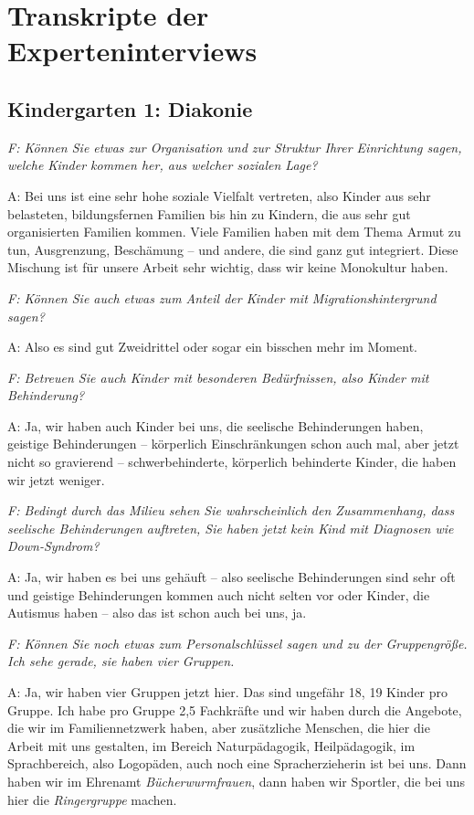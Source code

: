 \chapter{Transkripte der Experteninterviews}
\section{Kindergarten 1: Diakonie}
\begin{linenumbers*}
\emph{F: Können Sie etwas zur Organisation und zur Struktur Ihrer Einrichtung sagen, welche Kinder kommen her, aus welcher sozialen Lage?}

A: Bei uns ist eine sehr hohe soziale Vielfalt vertreten, also Kinder aus sehr belasteten, bildungsfernen Familien bis hin zu Kindern, die aus sehr gut organisierten Familien kommen. Viele Familien haben mit dem Thema Armut zu tun, Ausgrenzung, Beschämung -- und andere, die sind ganz gut integriert. Diese Mischung ist für unsere Arbeit sehr wichtig, dass wir keine Monokultur haben. 

\emph{F: Können Sie auch etwas zum Anteil der Kinder mit Migrationshintergrund sagen?}

A: Also es sind gut Zweidrittel oder sogar ein bisschen mehr im Moment. 

\emph{F: Betreuen Sie auch Kinder mit besonderen Bedürfnissen, also Kinder mit Behinderung?}

A: Ja, wir haben auch Kinder bei uns, die seelische Behinderungen haben, geistige Behinderungen -- körperlich Einschränkungen schon auch mal, aber jetzt nicht so gravierend -- schwerbehinderte, körperlich behinderte Kinder, die haben wir jetzt weniger.

\emph{F: Bedingt durch das Milieu sehen Sie wahrscheinlich den Zusammenhang, dass seelische Behinderungen auftreten, Sie haben jetzt kein Kind mit Diagnosen wie Down-Syndrom?} 

A: Ja, wir haben es bei uns gehäuft -- also seelische Behinderungen sind sehr oft und geistige Behinderungen kommen auch nicht selten vor oder Kinder, die Autismus haben -- also das ist schon auch bei uns, ja.

\emph{F: Können Sie noch etwas zum Personalschlüssel sagen und zu der Gruppengröße. Ich sehe gerade, sie haben vier Gruppen.}

A: Ja, wir haben vier Gruppen jetzt hier. Das sind ungefähr 18, 19 Kinder pro Gruppe. Ich habe pro Gruppe 2,5 Fachkräfte und wir haben durch die Angebote, die wir im Familiennetzwerk haben, aber zusätzliche Menschen, die hier die Arbeit mit uns gestalten, im Bereich Naturpädagogik, Heilpädagogik, im Sprachbereich, also Logopäden, auch noch eine Spracherzieherin ist bei uns. Dann haben wir im Ehrenamt \emph{Bücherwurmfrauen}, dann haben wir Sportler, die bei uns hier die \emph{Ringergruppe} machen. 


\end{linenumbers*}

